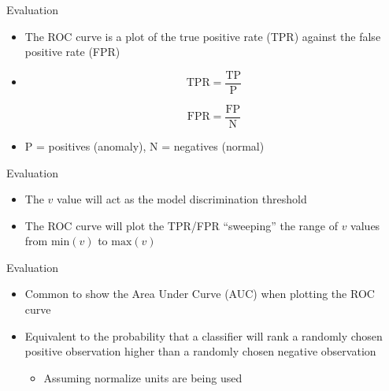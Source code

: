 \begin{frame}{Evaluation}
    \begin{itemize}
        \item The ROC curve is a plot of the true positive rate (TPR) against the false positive rate (FPR)
        \item[\xspace]
            \begin{equation} \label{eq:tpr}
                \text{TPR} = \dfrac{\text{TP}}{\text{P}}
            \end{equation}
            
            \begin{equation} \label{eq:fpr}
                \text{FPR} = \dfrac{\text{FP}}{\text{N}}
            \end{equation}  
        \item P = positives (anomaly), N = negatives (normal)
    \end{itemize}
\end{frame}

\begin{frame}{Evaluation}
    \begin{itemize}
        \item The $v$ value will act as the model discrimination threshold
        \item The ROC curve will plot the TPR/FPR ``sweeping'' the range of $v$ values from $\text{min}(v)$ to $\text{max}(v)$
    \end{itemize}
\end{frame}

\begin{frame}{Evaluation}
    \begin{itemize}
        \item Common to show the Area Under Curve (AUC) when plotting the ROC curve
        \item Equivalent to the probability that a classifier will rank a randomly chosen positive observation higher than a randomly chosen negative observation \cite{article:roc-analysis}
            \begin{itemize}
                \item Assuming normalize units are being used
            \end{itemize}
    \end{itemize}
\end{frame}
